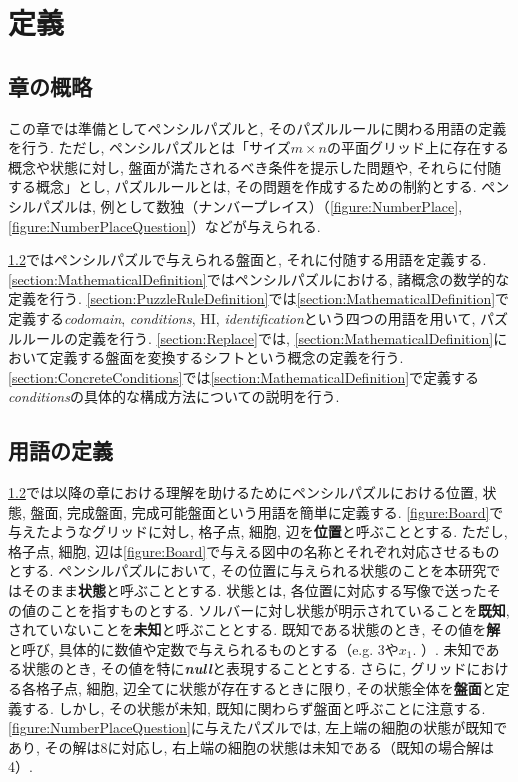 \chapter{定義}\label{chapter:Prepare}
\section{章の概略}\label{section:Outline}
この章では準備としてペンシルパズルと, そのパズルルールに関わる用語の定義を行う. ただし, ペンシルパズルとは「サイズ$m\times n$の平面グリッド上に存在する概念や状態に対し, 盤面が満たされるべき条件を提示した問題や, それらに付随する概念」とし, パズルルールとは, その問題を作成するための制約とする.
ペンシルパズルは, 例として数独（ナンバープレイス）（\cref{figure:NumberPlace}, \cref{figure:NumberPlaceQuestion}）などが与えられる.

\cref{section:WordDefinition}ではペンシルパズルで与えられる盤面と, それに付随する用語を定義する.
\cref{section:MathematicalDefinition}ではペンシルパズルにおける, 諸概念の数学的な定義を行う.
\cref{section:PuzzleRuleDefinition}では\cref{section:MathematicalDefinition}で定義する\textit{codomain}, \textit{conditions}, HI, \textit{identification}という四つの用語を用いて, パズルルールの定義を行う.
\cref{section:Replace}では, \cref{section:MathematicalDefinition}において定義する盤面を変換するシフトという概念の定義を行う.
\cref{section:ConcreteConditions}では\cref{section:MathematicalDefinition}で定義する\textit{conditions}の具体的な構成方法についての説明を行う.

\section{用語の定義}\label{section:WordDefinition}
\cref{section:WordDefinition}では以降の章における理解を助けるためにペンシルパズルにおける位置, 状態, 盤面, 完成盤面, 完成可能盤面という用語を簡単に定義する. \cref{figure:Board}で与えたようなグリッドに対し, 格子点, 細胞, 辺を\textbf{位置}と呼ぶこととする. ただし, 格子点, 細胞, 辺は\cref{figure:Board}で与える図中の名称とそれぞれ対応させるものとする. ペンシルパズルにおいて, その位置に与えられる状態のことを本研究ではそのまま\textbf{状態}と呼ぶこととする. 状態とは, 各位置に対応する写像で送ったその値のことを指すものとする. ソルバーに対し状態が明示されていることを\textbf{既知}, されていないことを\textbf{未知}と呼ぶこととする. 既知である状態のとき, その値を\textbf{解}と呼び, 具体的に数値や定数で与えられるものとする（e.g. 3や$x_1$. ）. 未知である状態のとき, その値を特に\textbf{\textit{null}}と表現することとする. さらに, グリッドにおける各格子点, 細胞, 辺全てに状態が存在するときに限り, その状態全体を\textbf{盤面}と定義する. しかし, その状態が未知, 既知に関わらず盤面と呼ぶことに注意する. \cref{figure:NumberPlaceQuestion}に与えたパズルでは, 左上端の細胞の状態が既知であり, その解は8に対応し, 右上端の細胞の状態は未知である（既知の場合解は4）.


